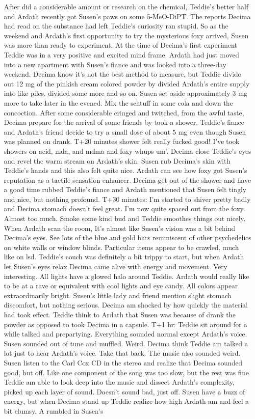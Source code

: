 \documentclass[12pt]{book}
\begin{document}
After did a considerable amount or research on the chemical, Teddie's better half and Ardath recently got Susen's paws on some 5-MeO-DiPT. The reports Decima had read on the substance had left Teddie's curiosity ran stupid. So as the weekend and Ardath's first opportunity to try the mysterious foxy arrived, Susen was more than ready to experiment. At the time of Decima's first experiment Teddie was in a very positive and excited mind frame. Ardath had just moved into a new apartment with Susen's fiance and was looked into a three-day weekend. Decima know it's not the best method to measure, but Teddie divide out 12 mg of the pinkish cream colored powder by divided Ardath's entire supply into like piles, divided some more and so on. Susen set aside approximately 3 mg more to take later in the evened. Mix the schtuff in some cola and down the concoction. After some considerable cringed and twitched, from the awful taste, Decima prepare for the arrival of some friends by took a shower. Teddie's fiance and Ardath's friend decide to try a small dose of about 5 mg even though Susen was planned on drank. T+20 minutes shower felt really fucked good! I've took showers on acid, mda, and mdma and foxy whups um'. Decima close Teddie's eyes and revel the warm stream on Ardath's skin. Susen rub Decima's skin with Teddie's hands and this also felt quite nice. Ardath can see how foxy got Susen's reputation as a tactile sensation enhancer. Decima get out of the shower and have a good time rubbed Teddie's fiance and Ardath mentioned that Susen felt tingly and nice, but nothing profound. T+30 minutes: I'm started to shiver pretty badly and Decima stomach doesn't feel great. I'm now quite spaced out from the foxy. Almost too much. Smoke some kind bud and Teddie smoothes things out nicely. When Ardath scan the room, It's almost like Susen's vision was a bit behind Decima's eyes. See lots of the blue and gold bars reminiscent of other psychedelics on white walls or window blinds. Particular items appear to be crawled, much like on lsd. Teddie's couch was definitely a bit trippy to start, but when Ardath let Susen's eyes relax Decima came alive with energy and movement. Very interesting. All lights have a glowed halo around Teddie. Ardath would really like to be at a rave or equivalent with cool lights and eye candy. All colors appear extraordinarily bright. Susen's little lady and friend mention slight stomach discomfort, but nothing serious. Decima am shocked by how quickly the material had took effect. Teddie think to Ardath that Susen was because of drank the powder as opposed to took Decima in a capsule. T+1 hr: Teddie sit around for a while talked and prepartying. Everything sounded normal except Ardath's voice. Susen sounded out of tune and muffled. Weird. Decima think Teddie am talked a lot just to hear Ardath's voice. Take that back. The music also sounded weird. Susen listen to the Carl Cox CD in the stereo and realize that Decima sounded good, but off. Like one component of the song was too slow, but the rest was fine. Teddie am able to look deep into the music and dissect Ardath's complexity, picked up each layer of sound. Doesn't sound bad, just off. Susen have a buzz of energy, but when Decima stand up Teddie realize how high Ardath am and feel a bit clumsy. A rumbled in Susen's 
\end{document}
